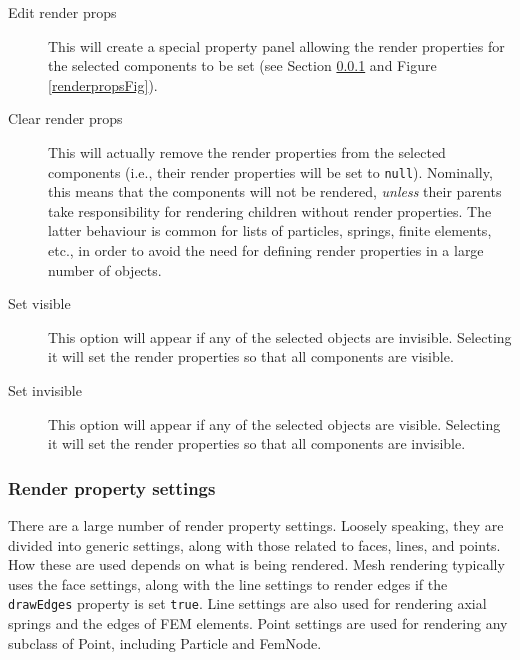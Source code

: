 \documentclass{article}
\begin{document}
\begin{description}

\item[Edit render props]\mbox{}

This will create a special property panel allowing the render properties for
the selected components to be set (see Section \ref{renderPropSettingsSec}
and Figure \ref{renderpropsFig}).

\item[Clear render props]\mbox{}

This will actually remove the render properties
from the selected components (i.e., their render properties will be
set to {\tt null}).  Nominally, this means that the components will not be
rendered, {\it unless} their parents take responsibility for rendering
children without render properties. The latter behaviour is common for
lists of particles, springs, finite elements, etc., in order to
avoid the need for defining render properties in a large number
of objects.

\item[Set visible]\mbox{}

This option will appear if any of the selected objects are
invisible. Selecting it will set the render properties so
that all components are visible.

\item[Set invisible]\mbox{}

This option will appear if any of the selected objects are
visible. Selecting it will set the render properties so
that all components are invisible.

\end{description}

\subsubsection{Render property settings}
\label{renderPropSettingsSec}

There are a large number of render property settings. Loosely
speaking, they are divided into generic settings, along with those
related to faces, lines, and points. How these are used depends on
what is being rendered. Mesh rendering typically uses the face
settings, along with the line settings to render edges if the
{\tt drawEdges} property is set {\tt true}.  Line settings are also used for
rendering axial springs and the edges of FEM elements.  Point settings
are used for rendering any subclass of Point, including Particle and
FemNode. 
\end{document}
